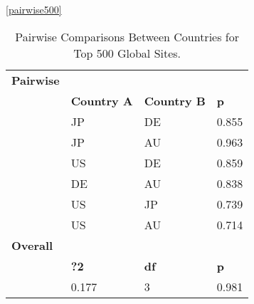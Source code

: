 \documentclass[journal]{IEEEtran}
\begin{document}
\begin{table}[h]
\centering
\caption{Pairwise Comparisons Between Countries for Top 500 Global Sites.}
\ref{pairwise500}
\begin{tabular}{llll}
\multicolumn{1}{r}{\textbf{Pairwise}} & \multicolumn{1}{r}{\textbf{}} & \multicolumn{1}{r}{\textbf{}} & \multicolumn{1}{r}{\textbf{}} \\
\textbf{}                             & \textbf{Country A}            & \textbf{Country B}            & \textbf{p}                    \\
                                      & JP                            & DE                            & 0.855                         \\
                                      & JP                            & AU                            & 0.963                         \\
                                      & US                            & DE                            & 0.859                         \\
                                      & DE                            & AU                            & 0.838                         \\
                                      & US                            & JP                            & 0.739                         \\
                                      & US                            & AU                            & 0.714                         \\
\textbf{Overall}                      & \textbf{}                     & \textbf{}                     & \textbf{}                     \\
\textbf{}                             & \textbf{?2}                   & \textbf{df}                   & \textbf{p}                    \\
                                      & 0.177                         & 3                             & 0.981                        
\end{tabular}
\end{table}
\end{document}
